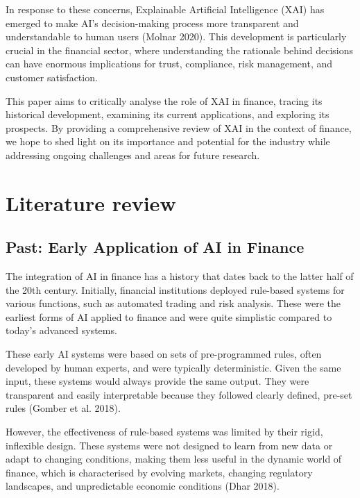 \documentclass[
  letterpaper,
  DIV=11,
  numbers=noendperiod]{scrartcl}
\begin{document}
In response to these concerns, Explainable Artificial Intelligence (XAI)
has emerged to make AI's decision-making process more transparent and
understandable to human users (Molnar 2020). This development is
particularly crucial in the financial sector, where understanding the
rationale behind decisions can have enormous implications for trust,
compliance, risk management, and customer satisfaction.

This paper aims to critically analyse the role of XAI in finance,
tracing its historical development, examining its current applications,
and exploring its prospects. By providing a comprehensive review of XAI
in the context of finance, we hope to shed light on its importance and
potential for the industry while addressing ongoing challenges and areas
for future research.

\hypertarget{literature-review}{%
\section{Literature review}\label{literature-review}}

\hypertarget{past-early-application-of-ai-in-finance}{%
\subsection{Past: Early Application of AI in
Finance}\label{past-early-application-of-ai-in-finance}}

The integration of AI in finance has a history that dates back to the
latter half of the 20th century. Initially, financial institutions
deployed rule-based systems for various functions, such as automated
trading and risk analysis. These were the earliest forms of AI applied
to finance and were quite simplistic compared to today's advanced
systems.

These early AI systems were based on sets of pre-programmed rules, often
developed by human experts, and were typically deterministic. Given the
same input, these systems would always provide the same output. They
were transparent and easily interpretable because they followed clearly
defined, pre-set rules (Gomber et al. 2018).

However, the effectiveness of rule-based systems was limited by their
rigid, inflexible design. These systems were not designed to learn from
new data or adapt to changing conditions, making them less useful in the
dynamic world of finance, which is characterised by evolving markets,
changing regulatory landscapes, and unpredictable economic conditions
(Dhar 2018).
\end{document}
